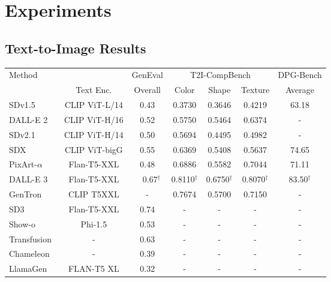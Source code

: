 \section{Experiments}

\subsection{Text-to-Image Results}


\begin{table}[t]
    \centering
        \begin{tabular}{l|c|c|ccc|c}
            \toprule
            \multirow{2}{*}{Method}&   & \multicolumn{1}{c|}{GenEval}  &  \multicolumn{3}{c|}{T2I-CompBench}  &  \multicolumn{1}{c}{DPG-Bench}  \\
             & Text Enc. & Overall &  Color  & Shape & Texture &  Average   \\
            \midrule
            SDv1.5~\citep{rombach2022high}       &  CLIP ViT-L/14     & 0.43 & 0.3730 & 0.3646 & 0.4219 & 63.18   \\
            DALL-E 2~\citep{ramesh2022hierarchical} & CLIP ViT-H/16  & 0.52 & 0.5750 & 0.5464 & 0.6374 & -   \\
            SDv2.1~\citep{rombach2022high}          &  CLIP ViT-H/14  & 0.50 & 0.5694 & 0.4495 &  0.4982 & -   \\
            SDX~\citep{podell2023sdxl}             &  CLIP ViT-bigG  & 0.55 & 0.6369 & 0.5408 & 0.5637 & 74.65 \\
            PixArt-$\alpha$~\citep{chen2023pixart} &  Flan-T5-XXL  & 0.48 & 0.6886 & 0.5582 & 0.7044 & 71.11   \\
            DALL-E 3~\citep{betker2023improving}       & Flan-T5-XXL   &~~0.67$^\dagger$  & 0.8110$^\dagger$ & 0.6750$^\dagger$ & 0.8070$^\dagger$ & 83.50$^\dagger$    \\ 
            GenTron~\citep{chen2024gentron} & CLIP T5XXL &  -  & 0.7674 & 0.5700 & 0.7150  & - \\
            SD3~\citep{esser2024scaling} &  Flan-T5-XXL & 0.74 & - & - & - & -  \\
            Show-o~\citep{xie2024show}      & Phi-1.5   & 0.53 & - & - & - & - \\
            Transfusion~\citep{zhou2024transfusion}  & -  & 0.63 & - & - & - &  - \\
            Chameleon~\citep{lu2024chameleon}   & -  & 0.39 & - & - & - & - \\
            LlamaGen~\citep{sun2024autoregressive}   & FLAN-T5 XL  & 0.32  & - & - & - & - \\

\end{tabular}
\end{table}
